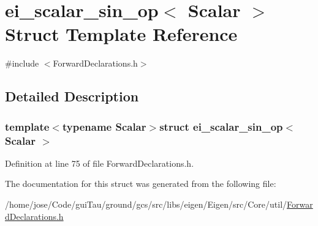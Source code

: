\hypertarget{structei__scalar__sin__op}{\section{ei\-\_\-scalar\-\_\-sin\-\_\-op$<$ Scalar $>$ Struct Template Reference}
\label{structei__scalar__sin__op}
}


{\ttfamily \#include $<$Forward\-Declarations.\-h$>$}



\subsection{Detailed Description}
\subsubsection*{template$<$typename Scalar$>$struct ei\-\_\-scalar\-\_\-sin\-\_\-op$<$ Scalar $>$}



Definition at line 75 of file Forward\-Declarations.\-h.



The documentation for this struct was generated from the following file\-:\begin{DoxyCompactItemize}
\item 
/home/jose/\-Code/gui\-Tau/ground/gcs/src/libs/eigen/\-Eigen/src/\-Core/util/\hyperlink{_forward_declarations_8h}{Forward\-Declarations.\-h}\end{DoxyCompactItemize}
